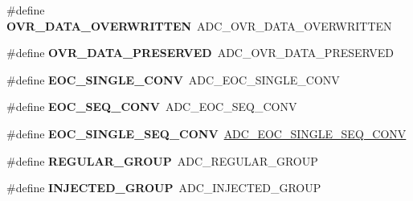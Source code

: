 \begin{DoxyCompactItemize}
\#define {\bfseries O\+V\+R\+\_\+\+D\+A\+T\+A\+\_\+\+O\+V\+E\+R\+W\+R\+I\+T\+T\+EN}~A\+D\+C\+\_\+\+O\+V\+R\+\_\+\+D\+A\+T\+A\+\_\+\+O\+V\+E\+R\+W\+R\+I\+T\+T\+EN
\item 
\mbox{\label{group___h_a_l___a_d_c___aliased___defines_ga1fb9c5eb49053187ac90c0af92662be6}} 
\#define {\bfseries O\+V\+R\+\_\+\+D\+A\+T\+A\+\_\+\+P\+R\+E\+S\+E\+R\+V\+ED}~A\+D\+C\+\_\+\+O\+V\+R\+\_\+\+D\+A\+T\+A\+\_\+\+P\+R\+E\+S\+E\+R\+V\+ED
\item 
\mbox{\label{group___h_a_l___a_d_c___aliased___defines_ga8160cf13a85d797ef96972174a863945}} 
\#define {\bfseries E\+O\+C\+\_\+\+S\+I\+N\+G\+L\+E\+\_\+\+C\+O\+NV}~A\+D\+C\+\_\+\+E\+O\+C\+\_\+\+S\+I\+N\+G\+L\+E\+\_\+\+C\+O\+NV
\item 
\mbox{\label{group___h_a_l___a_d_c___aliased___defines_gac7022f73c8906a37c7faf511bc720dda}} 
\#define {\bfseries E\+O\+C\+\_\+\+S\+E\+Q\+\_\+\+C\+O\+NV}~A\+D\+C\+\_\+\+E\+O\+C\+\_\+\+S\+E\+Q\+\_\+\+C\+O\+NV
\item 
\mbox{\label{group___h_a_l___a_d_c___aliased___defines_ga503236c97697e9135a9d1c2c88cac7c9}} 
\#define {\bfseries E\+O\+C\+\_\+\+S\+I\+N\+G\+L\+E\+\_\+\+S\+E\+Q\+\_\+\+C\+O\+NV}~\hyperlink{group___a_d_c___e_o_c_selection_ga0cbb4e6ee76ee1bef233212bf947d320}{A\+D\+C\+\_\+\+E\+O\+C\+\_\+\+S\+I\+N\+G\+L\+E\+\_\+\+S\+E\+Q\+\_\+\+C\+O\+NV}
\item 
\mbox{\label{group___h_a_l___a_d_c___aliased___defines_ga37bac62f24a8600f62d0d35683a0a4de}} 
\#define {\bfseries R\+E\+G\+U\+L\+A\+R\+\_\+\+G\+R\+O\+UP}~A\+D\+C\+\_\+\+R\+E\+G\+U\+L\+A\+R\+\_\+\+G\+R\+O\+UP
\item 
\mbox{\label{group___h_a_l___a_d_c___aliased___defines_gaa5d1cfe7b35cb724d898622cbd6b7894}} 
\#define {\bfseries I\+N\+J\+E\+C\+T\+E\+D\+\_\+\+G\+R\+O\+UP}~A\+D\+C\+\_\+\+I\+N\+J\+E\+C\+T\+E\+D\+\_\+\+G\+R\+O\+UP
\item 
\mbox{\label{group___h_a_l___a_d_c___aliased___defines_ga1e691aaec563e444d3965d5d98d1c47b}} 

\end{DoxyCompactItemize}
